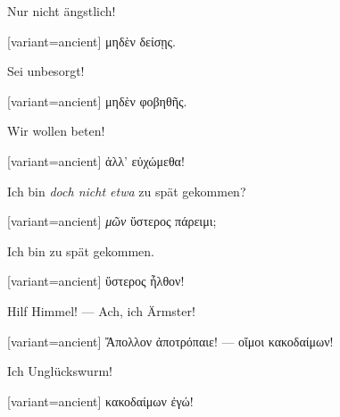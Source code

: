 Nur nicht ängstlich!

\switchcolumn

\begin{greek}[variant=ancient]%
μηδὲν δείσῃς.

\end{greek}%
\switchcolumn*

Sei unbesorgt!

\switchcolumn

\begin{greek}[variant=ancient]%
μηδὲν φοβηθῆς.

\end{greek}%
Wir wollen beten!

\switchcolumn

\begin{greek}[variant=ancient]%
ἀλλ' εὐχώμεθα!

\end{greek}%
\switchcolumn*

Ich bin \emph{doch nicht etwa} zu spät gekommen?

\switchcolumn

\begin{greek}[variant=ancient]%
\emph{μῶν} ὕστερος πάρειμι;

\end{greek}%
\switchcolumn*

Ich bin zu spät gekommen.

\switchcolumn

\begin{greek}[variant=ancient]%
ὕστερος ἦλθον!

\end{greek}%
\switchcolumn*

Hilf Himmel! --- Ach, ich Ärmster!

\switchcolumn

\begin{greek}[variant=ancient]%
Ἄπολλον ἀποτρόπαιε! --- οἴμοι κακοδαίμων!

\end{greek}%
\switchcolumn*

Ich Unglücks\textcompwordmark{}wurm!

\switchcolumn

\begin{greek}[variant=ancient]%
κακοδαίμων ἐγώ!

\end{greek}%
\switchcolumn*


